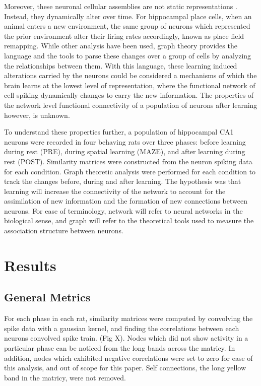 \documentclass[9pt,twocolumn,twoside,lineno]{pnas-new}
\begin{document}
Moreover, these neuronal cellular assemblies are not static representations  \cite{pastalkova2008internally}. Instead, they dynamically alter over time. For hippocampal place cells, when an animal enters a new environment, the same group of neurons which represented the prior environment alter their firing rates accordingly, known as place field remapping. While other analysis have been used, graph theory provides the language and the tools \cite{rubinov2010complex} to parse these changes over a group of cells by analyzing the relationships between them. With this language, these learning induced alterations carried by the neurons could be considered a mechanisms of which the brain learns at the lowest level of representation, where the functional network of cell spiking dynamically changes to carry the new information. The properties of the network level functional connectivity of a population of neurons after learning however, is unknown.

To understand these properties further, a population of hippocampal CA1 neurons were recorded \cite{grosmark2016diversity} in four behaving rats over three phases: before learning during rest (PRE), during spatial learning (MAZE), and after learning during rest (POST). Similarity matrices were constructed from the neuron spiking data for each condition. Graph theoretic analysis were performed for each condition to track the changes before, during and after learning. The hypothesis was that learning will increase the connectivity of the network to account for the assimilation of new information and the formation of new connections between neurons. For ease of terminology, network will refer to neural networks in the biological sense, and graph will refer to the theoretical tools used to measure the association structure between neurons.



\section*{Results}
\subsection*{General Metrics}
For each phase in each rat, similarity matrices were computed by convolving the spike data with a gaussian kernel, and finding the correlations between each neurons convolved spike train. (Fig X). Nodes which did not show activity in a particular phase can be noticed from the long bands across the matricy. In addition, nodes which exhibited negative correlations were set to zero for ease of this analysis, and out of scope for this paper. Self connections, the long yellow band in the matricy, were not removed.
\end{document}
